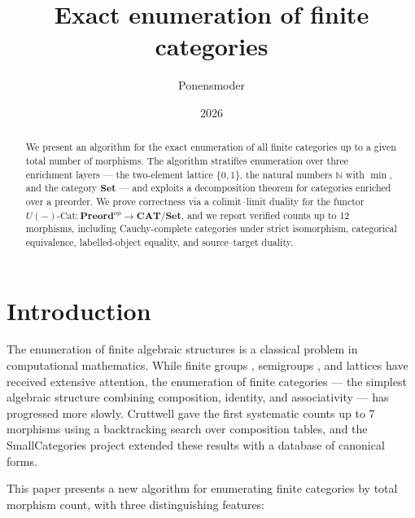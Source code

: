 \documentclass[12pt,a4paper]{amsart}
\title{Exact enumeration of finite categories}
\author{Ponensmoder}
\date{2026}
\theoremstyle{definition}
\theoremstyle{remark}
\newcommand{\Set}{\mathbf{Set}}
\newcommand{\Preord}{\mathbf{Preord}}
\newcommand{\CAT}{\mathbf{CAT}}
\newcommand{\op}{\mathrm{op}}
\begin{document}
\maketitle

\begin{abstract}
  We present an algorithm for the exact enumeration of all finite categories
  up to a given total number of morphisms.  The algorithm stratifies
  enumeration over three enrichment layers --- the two-element lattice
  $\{0,1\}$, the natural numbers $\mathbb{N}$ with $\min$, and the category
  $\Set$ --- and exploits a decomposition theorem for categories enriched
  over a preorder.  We prove correctness via a colimit--limit duality for
  the functor $U(-)\text{-Cat} : \Preord^{\op} \to \CAT/\Set$, and we
  report verified counts up to 12 morphisms, including Cauchy-complete
  categories under strict isomorphism, categorical equivalence, labelled-object
  equality, and source--target duality.
\end{abstract}

\tableofcontents

\section{Introduction}
\label{sec:introduction}

The enumeration of finite algebraic structures is a classical problem in
computational mathematics.  While finite groups \cite{besche2002},
semigroups \cite{distler2011}, and lattices \cite{jevons1897} have received
extensive attention, the enumeration of finite categories --- the simplest
algebraic structure combining composition, identity, and associativity ---
has progressed more slowly.  Cruttwell \cite{cruttwell2014} gave the first
systematic counts up to 7 morphisms using a backtracking search over
composition tables, and the SmallCategories project \cite{smallcats}
extended these results with a database of canonical forms.

This paper presents a new algorithm for enumerating finite categories by
total morphism count, with three distinguishing features:
\end{document}
